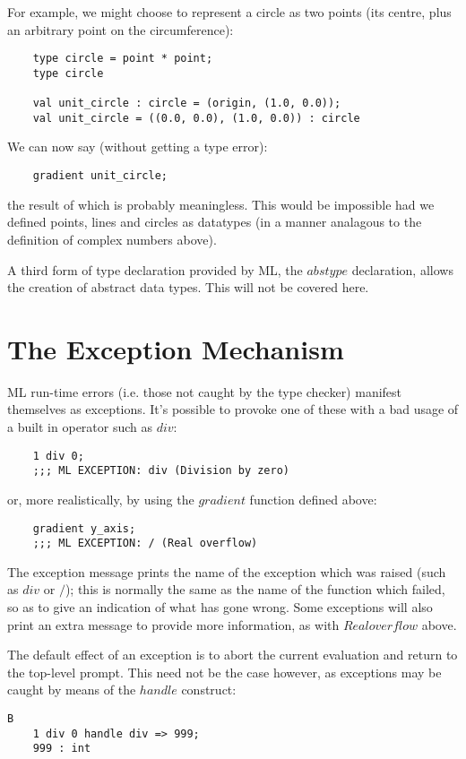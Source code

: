 For example, we might choose to represent a circle as two points (its
centre, plus an arbitrary point on the circumference):
\begin{verbatim}
    type circle = point * point;
    type circle

    val unit_circle : circle = (origin, (1.0, 0.0));
    val unit_circle = ((0.0, 0.0), (1.0, 0.0)) : circle
\end{verbatim}

We can now say (without getting a type error):
\begin{verbatim}
    gradient unit_circle;
\end{verbatim}

the result of which is probably meaningless. This would be impossible
had we defined points, lines and circles as datatypes (in a manner
analagous to the definition of complex numbers above).

A third form of type declaration provided by ML, the $abstype$
declaration, allows the creation of abstract data types. This will not
be covered here.


\section{The Exception Mechanism}

ML run-time errors (i.e. those not caught by the type checker) manifest
themselves as exceptions. It's possible to provoke one of these with a
bad usage of a built in operator such as $div$:
\begin{verbatim}
    1 div 0;
    ;;; ML EXCEPTION: div (Division by zero)
\end{verbatim}

or, more realistically, by using the $gradient$ function defined above:
\begin{verbatim}
    gradient y_axis;
    ;;; ML EXCEPTION: / (Real overflow)
\end{verbatim}

The exception message prints the name of the exception which was raised
(such as $div$ or $/$); this is normally the same as the name of the
function which failed, so as to give an indication of what has gone
wrong. Some exceptions will also print an extra message to provide more
information, as with $Real overflow$ above.

The default effect of an exception is to abort the current evaluation
and return to the top-level prompt. This need not be the case however,
as exceptions may be caught by means of the $handle$ construct:
\begin{verbatim}B
    1 div 0 handle div => 999;
    999 : int
\end{verbatim}


